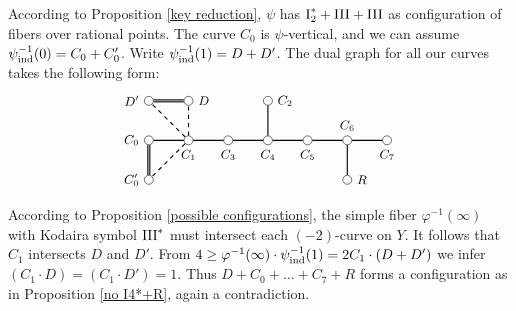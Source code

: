 \documentclass[oneside, 12pt]{amsart}
\theoremstyle{definition}
\theoremstyle{remark}
\newcommand{\I}{\text{\rm I}}
\newcommand{\III}{\text{\rm III}}
\newcommand{\ind}{\text{\rm ind}}
\newcommand{\inv}{{-1}}
\begin{document}
According to Proposition \ref{key reduction}, $\psi$ has $\I_2^*+\III+\III$
as  configuration of fibers over rational points. The curve $C_0$ is $\psi$-vertical, and
we can assume $\psi^\inv_\ind(0)=C_0+C_0'$. Write $\psi^\inv_\ind(1)=D+D'$.
The dual graph for all our curves takes the following form:
\begin{equation*}
\begin{gathered}
\begin{tikzpicture}
[node distance=1cm, font=\small]
\tikzstyle{vertex}=[circle, draw, fill=white, inner sep=0mm, minimum size=1.5ex]
\node[vertex]	(C0)  	at (1,0)  [		label=left:{$C_0$}] {};
\node[vertex]	(C1)	[right of=C0,	label=below:{$C_1$}] {};
\node[vertex]	(C3)	[right of=C1,	label=below:{$C_3$}] {};
\node[vertex]	(C4)	[right of=C3,	label=below:{$C_4$}] {};
\node[vertex]	(C5)	[right of=C4,	label=below:{$C_5$}] {};
\node[vertex]	(C6)	[right of=C5,	label=above:{$C_6$}] {};
\node[vertex]	(C7)	[right of=C6,	label=below:{$C_7$}] {};
\node[vertex]	(C2)	[above of=C4,	label=right:{$C_2$}] {};

\node[vertex]	(R)		[below of=C6, 	label=right:{$R$}] {};
\node[vertex]	(C0')	[below of=C0, 	label=left:{$C_0'$}] {};
\node[vertex]	(D)		[above of=C1, 	label=right:{$D$}] {};
\node[vertex]	(D')	[above of=C0, 	label=left:{$D'$}] {};

\draw[thick]    (C0)--(C1)--(C3)--(C4)-- (C5)--(C6)--(C7);
\draw[thick]    (C2)--(C4);
\draw[thick]    (R)--(C6);
\draw[thick,double]  (D)--(D');
\draw[thick,double]  (C0)--(C0');
\draw[thick,dashed]  (C1)--(C0');
\draw[thick,dashed]  (C1)--(D);
\draw[thick,dashed]  (C1)--(D');

\end{tikzpicture}
\end{gathered}
\end{equation*}
According to Proposition \ref{possible configurations}, the simple fiber $\varphi^\inv(\infty)$ with Kodaira symbol $\III^*$
must intersect each $(-2)$-curve on $Y$. It follows that  $C_1$ intersects $D$ and $D'$.
From
$4\geq \varphi^{-1}(\infty)\cdot \psi^\inv_\ind(1) = 2C_1\cdot (D+D')$
we infer $(C_1\cdot D)=(C_1\cdot D')=1$. Thus $D+C_0+\ldots+C_7+R$ forms a configuration as in Proposition \ref{no I4*+R}, 
again a contradiction.
\end{document}
